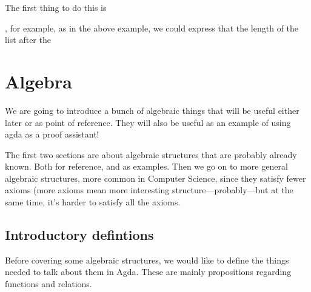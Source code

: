 \documentclass{article}
\begin{document}
The first thing to do this is 

, for example, as in the above example, we could express that the length of the list after the 
\newcommand{\nanring}{non-associative non-ring}
\newcommand{\Nanring}{Non-associative non-ring}
\section{Algebra}
We are going to introduce a bunch of algebraic things that will be useful either later or as point of reference. They will also be useful as an example of using agda as a proof assistant!

The first two sections are about algebraic structures that are probably already known. Both for reference, and as examples. Then we go on to more general algebraic structures, more common in Computer Science, since they satisfy fewer axioms (more axioms mean more interesting structure---probably---but at the same time, it's harder to satisfy all the axioms.
\subsection{Introductory defintions}
Before covering some algebraic structures, we would like to define the things needed to talk about them in Agda. These are mainly propositions regarding functions and relations.
\end{document}
